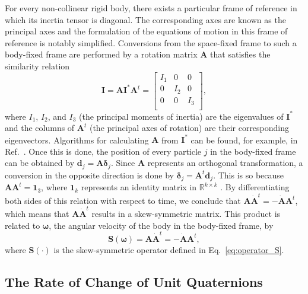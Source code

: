 \documentclass[aip,jcp,reprint,amsmath,amssymb,raggedbottom]{revtex4-1}
\newcommand{\mt}[1]{\boldsymbol{\mathbf{#1}}}           %
\newcommand{\vt}[1]{\boldsymbol{\mathbf{#1}}}           %
\newcommand{\tr}[1]{#1^t}                               %
\begin{document}
For every non-collinear rigid body, there exists a particular frame of reference in which its inertia tensor is diagonal. The corresponding axes are known as the principal axes and the formulation of the equations of motion in this frame of reference is notably simplified. Conversions from the space-fixed frame to such a body-fixed frame are performed by a rotation matrix $\mt A$ that satisfies the similarity relation\citep{Goldstein2002}
\[
{\mt I} = {\mt A} {\mt I}^\ast \tr{\mt A} = \left[ \begin{array}{ccc}
I_1 &   0 &   0 \\
  0 & I_2 &   0 \\
  0 &   0 & I_3 \\
\end{array} \right],
\]
where $I_1$, $I_2$, and $I_3$ (the principal moments of inertia) are the eigenvalues of ${\mt I}^\ast$ and the columns of $\tr{\mt A}$ (the principal axes of rotation) are their corresponding eigenvectors. Algorithms for calculating $\mt A$ from $\mt I^\ast$ can be found, for example, in Ref.~. Once this is done, the position of every particle $j$ in the body-fixed frame can be obtained by ${\vt d}_j = {\mt A} {\vt \delta}_j$. Since $\mt A$ represents an orthogonal transformation, a conversion in the opposite direction is done by ${\vt \delta}_j = \tr{\mt A} {\vt d}_j$.\cite{Goldstein2002} This is so because $\mt A \tr{\mt A} = \mt 1_3$, where $\mt 1_k$ represents an identity matrix in $\mathbb{R}^{k \times k}$ . By differentiating both sides of this relation with respect to time, we conclude that ${\mt A} \tr{\dot{\mt A}} = -\dot{\mt A} \tr{\mt A}$, which means that $\mt A \tr{\dot{\mt A}}$ results in a skew-symmetric matrix. This product is related to $\vt \omega$, the angular velocity of the body in the body-fixed frame, by\cite{Haug1989}
\begin{equation}
\label{eq:relation_A_omega}
\mt S(\vt \omega) = \mt A \tr{\dot{\mt A}} = -\dot{\mt A} \tr{\mt A},
\end{equation}
where $\mt S(\cdot)$ is the skew-symmetric operator defined in Eq.~\ref{eq:operator_S}.

\subsection{The Rate of Change of Unit Quaternions}
\label{sec:eulerparameters}
\end{document}
